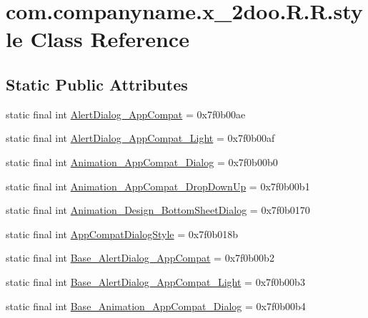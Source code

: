 \hypertarget{classcom_1_1companyname_1_1x__2doo_1_1_r_1_1style}{
\section{com.companyname.x\_\-2doo.R.R.style Class Reference}
\label{classcom_1_1companyname_1_1x__2doo_1_1_r_1_1style}
}
\subsection*{Static Public Attributes}
\begin{CompactItemize}
\item 
static final int \hyperlink{classcom_1_1companyname_1_1x__2doo_1_1_r_1_1style_cf3c761853ec79dfbe7bf721bfb46614}{AlertDialog\_\-AppCompat} = 0x7f0b00ae
\item 
static final int \hyperlink{classcom_1_1companyname_1_1x__2doo_1_1_r_1_1style_a18855fea60b2d2f602b2613d0fc2020}{AlertDialog\_\-AppCompat\_\-Light} = 0x7f0b00af
\item 
static final int \hyperlink{classcom_1_1companyname_1_1x__2doo_1_1_r_1_1style_aceacb9acc5c73e10229db659251865f}{Animation\_\-AppCompat\_\-Dialog} = 0x7f0b00b0
\item 
static final int \hyperlink{classcom_1_1companyname_1_1x__2doo_1_1_r_1_1style_d434cfc3add8b44a8ee2e7711046182f}{Animation\_\-AppCompat\_\-DropDownUp} = 0x7f0b00b1
\item 
static final int \hyperlink{classcom_1_1companyname_1_1x__2doo_1_1_r_1_1style_6e23c10141eca18ed8ad7b94c293ffcc}{Animation\_\-Design\_\-BottomSheetDialog} = 0x7f0b0170
\item 
static final int \hyperlink{classcom_1_1companyname_1_1x__2doo_1_1_r_1_1style_1d35cffe6fd69b4033c316e3a11891ae}{AppCompatDialogStyle} = 0x7f0b018b
\item 
static final int \hyperlink{classcom_1_1companyname_1_1x__2doo_1_1_r_1_1style_5aaf5d6b41f2ef9a50327083aa5c4701}{Base\_\-AlertDialog\_\-AppCompat} = 0x7f0b00b2
\item 
static final int \hyperlink{classcom_1_1companyname_1_1x__2doo_1_1_r_1_1style_c512be8267c4d98e048bc671423c8b1f}{Base\_\-AlertDialog\_\-AppCompat\_\-Light} = 0x7f0b00b3
\item 
static final int \hyperlink{classcom_1_1companyname_1_1x__2doo_1_1_r_1_1style_b5e2eac42fb36dd863df67450b80d98c}{Base\_\-Animation\_\-AppCompat\_\-Dialog} = 0x7f0b00b4
\item 

\end{CompactItemize}
